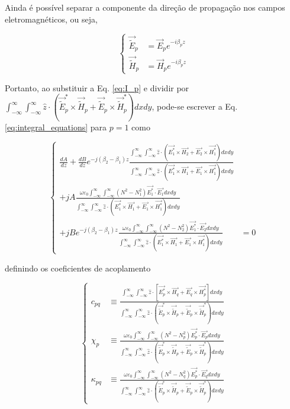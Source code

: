 \documentclass[final,12pt,times,twocolumn,authoryear]{elsarticle}
\newcommand{\tildee}{ \vec{\tilde{E}}}
\newcommand{\tildeh}{ \vec{\tilde{H}}}
\newcommand{\epsz}{\varepsilon_0}
\newcommand{\couplingdenom}{ \int_{-\infty}^\infty \int_{-\infty}^\infty \hat{z}\cdot\left(\tildee_p^*\times\tildeh_p+\tildee_p\times\tildeh_p^*\right) dxdy }
\begin{document}
Ainda é possível separar a componente da direção de propagação nos campos eletromagnéticos, ou seja,

\begin{equation*}
\left\{
\begin{split}
\tildee_p &= \vec{E}_pe^{-i\beta_p z} \\
\tildeh_p &= \vec{H}_pe^{-i\beta_p z}
\end{split}
\right.
\end{equation*}

Portanto, ao substituir a Eq. \ref{eq:I_p} e dividir por $ \couplingdenom $, pode-se escrever a Eq. \ref{eq:integral_equations} para $p=1$ como

\begin{equation} \label{eq:z_sep_Eq_p1}
\left\{
\begin{split}
\frac{dA}{dz} + \frac{dB}{dz}e^{-j(\beta_2-\beta_1)z}\frac{\int_{-\infty}^\infty\int_{-\infty}^\infty \hat{z}\cdot\left( \vec{E_1^*}\times\vec{H_2} + \vec{E_2}\times\vec{H_1^*} \right) dxdy}{\int_{-\infty}^\infty\int_{-\infty}^\infty \hat{z}\cdot\left( \vec{E_1^*}\times\vec{H_1} + \vec{E_1}\times\vec{H_1^*} \right) dxdy} &\\
+ jA \frac{\omega\epsz  \int_{-\infty}^\infty\int_{-\infty}^\infty \left(N^2-N_1^2\right)\vec{E_1^*}\cdot\vec{E_1} dxdy}{\int_{-\infty}^\infty\int_{-\infty}^\infty \hat{z}\cdot\left( \vec{E_1^*}\times\vec{H_1} + \vec{E_1}\times\vec{H_1^*} \right) dxdy} &\\
+ jBe^{-j(\beta_2-\beta_1)z} \frac{\omega\epsz  \int_{-\infty}^\infty\int_{-\infty}^\infty \left(N^2-N_2^2\right)\vec{E_1^*}\cdot\vec{E_2} dxdy}{\int_{-\infty}^\infty\int_{-\infty}^\infty \hat{z}\cdot\left( \vec{E_1^*}\times\vec{H_1} + \vec{E_1}\times\vec{H_1^*} \right) dxdy} &= 0
\end{split}
\right.
\end{equation}

\noindent definindo os coeficientes de acoplamento

\begin{equation}
\label{eq:coupling_coeff}
\left\{
\begin{split}
c_{pq} &\equiv \frac{\int_{-\infty}^\infty\int_{-\infty}^\infty \hat{z} \cdot \left[ \vec{E_p^*}\times\vec{H_q} + \vec{E_q}\times\vec{H_p^*} \right] dxdy}{\couplingdenom} \\
\chi_{p} &\equiv \frac{\omega\epsz\int_{-\infty}^\infty\int_{-\infty}^\infty \left(N^2-N_p^2\right) \vec{E_p^*}\cdot\vec{E_p} dxdy}{\couplingdenom} \\
\kappa_{pq} &\equiv \frac{\omega\epsz\int_{-\infty}^\infty\int_{-\infty}^\infty \left(N^2-N_q^2\right) \vec{E_p^*}\cdot\vec{E_q} dxdy}{\couplingdenom}
\end{split} 
\right.
\end{equation}
\end{document}
